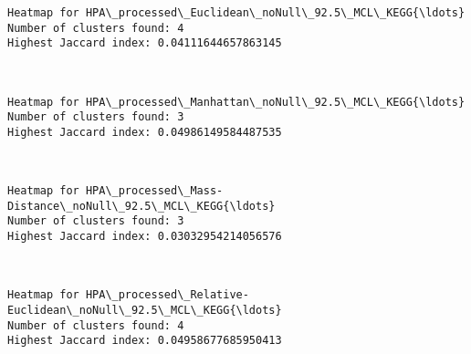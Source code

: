 \documentclass[11pt]{article}
\begin{document}
    \begin{Verbatim}[commandchars=\\\{\}]
Heatmap for HPA\_processed\_Euclidean\_noNull\_92.5\_MCL\_KEGG{\ldots}
Number of clusters found: 4
Highest Jaccard index: 0.04111644657863145

    \end{Verbatim}

    \begin{center}
    \end{center}
    { \hspace*{\fill} \\}
    
    \begin{Verbatim}[commandchars=\\\{\}]
Heatmap for HPA\_processed\_Manhattan\_noNull\_92.5\_MCL\_KEGG{\ldots}
Number of clusters found: 3
Highest Jaccard index: 0.04986149584487535

    \end{Verbatim}

    \begin{center}
    \end{center}
    { \hspace*{\fill} \\}
    
    \begin{Verbatim}[commandchars=\\\{\}]
Heatmap for HPA\_processed\_Mass-Distance\_noNull\_92.5\_MCL\_KEGG{\ldots}
Number of clusters found: 3
Highest Jaccard index: 0.03032954214056576

    \end{Verbatim}

    \begin{center}
    \end{center}
    { \hspace*{\fill} \\}
    
    \begin{Verbatim}[commandchars=\\\{\}]
Heatmap for HPA\_processed\_Relative-Euclidean\_noNull\_92.5\_MCL\_KEGG{\ldots}
Number of clusters found: 4
Highest Jaccard index: 0.04958677685950413

    \end{Verbatim}
\end{document}
